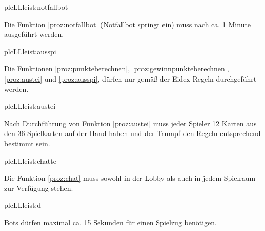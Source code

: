 \begin{description}[leftmargin=5em, style=sameline]
	\begin{lhp}{plc}{LL}{leist:notfallbot}
		\item Die Funktion \ref{proz:notfallbot} (Notfallbot springt ein) muss nach ca. 1 Minute ausgeführt werden.
	\end{lhp}

	\begin{lhp}{plc}{LL}{leist:ausspi}
		\item Die Funktionen \ref{proz:punkteberechnen}, \ref{proz:gewinnpunkteberechnen}, \ref{proz:austei} und \ref{proz:ausspi}, dürfen nur gemäß der Eidex Regeln durchgeführt werden.
	\end{lhp}

	\begin{lhp}{plc}{LL}{leist:austei}
		\item Nach Durchführung von Funktion \ref{proz:austei} muss jeder Spieler 12 Karten aus den 36 Spielkarten auf der Hand haben und der Trumpf den Regeln entsprechend bestimmt sein.
	\end{lhp}

	\begin{lhp}{plc}{LL}{leist:chatte}
		\item Die Funktion \ref{proz:chat} muss sowohl in der Lobby als auch in jedem Spielraum zur Verfügung stehen.
	\end{lhp}
	
	\begin{lhp}{plc}{LL}{leist:d}
		\item Bots dürfen maximal ca. 15 Sekunden für einen Spielzug benötigen.
	\end{lhp}

\end{description}